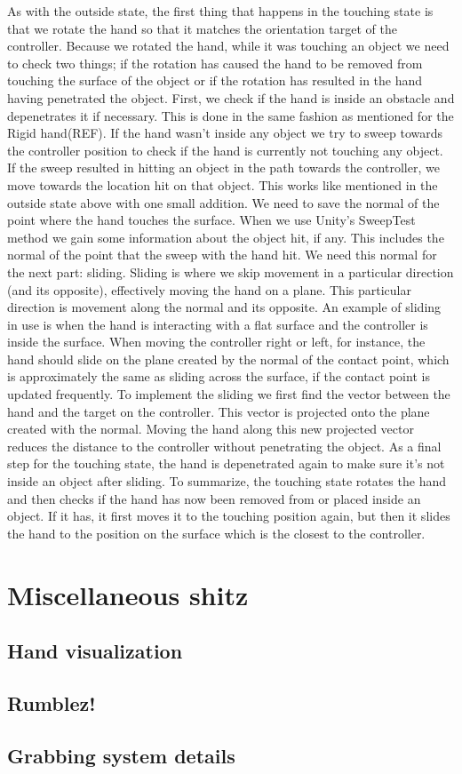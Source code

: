 As with the outside state, the first thing that happens in the touching state is that we rotate the hand so that it matches the orientation target of the controller. Because we rotated the hand, while it was touching an object we need to check two things; if the rotation has caused the hand to be removed from touching the surface of the object or if the rotation has resulted in the hand having penetrated the object. First, we check if the hand is inside an obstacle and depenetrates it if necessary. This is done in the same fashion as mentioned for the Rigid hand(REF). If the hand wasn't inside any object we try to sweep towards the controller position to check if the hand is currently not touching any object. If the sweep resulted in hitting an object in the path towards the controller, we move towards the location hit on that object. This works like mentioned in the outside state above with one small addition. We need to save the normal of the point where the hand touches the surface. When we use Unity's SweepTest method we gain some information about the object hit, if any. This includes the normal of the point that the sweep with the hand hit. We need this normal for the next part: sliding. Sliding is where we skip movement in a particular direction (and its opposite), effectively moving the hand on a plane. This particular direction is movement along the normal and its opposite. An example of sliding in use is when the hand is interacting with a flat surface and the controller is inside the surface. When moving the controller right or left, for instance, the hand should slide on the plane created by the normal of the contact point, which is approximately the same as sliding across the surface, if the contact point is updated frequently. To implement the sliding we first find the vector between the hand and the target on the controller. This vector is projected onto the plane created with the normal. Moving the hand along this new projected vector reduces the distance to the controller without penetrating the object. As a final step for the touching state, the hand is depenetrated again to make sure it's not inside an object after sliding. To summarize, the touching state rotates the hand and then checks if the hand has now been removed from or placed inside an object. If it has, it first moves it to the touching position again, but then it slides the hand to the position on the surface which is the closest to the controller.

\section{Miscellaneous shitz}
\label{sec:MISCELLANEOUSSHITZ}

\subsection{Hand visualization}
\label{subsec:handVisualization}

\subsection{Rumblez!}
\label{subsec:RUMLBEZ}

\subsection{Grabbing system details}
\label{subsec:grabbingSystem}